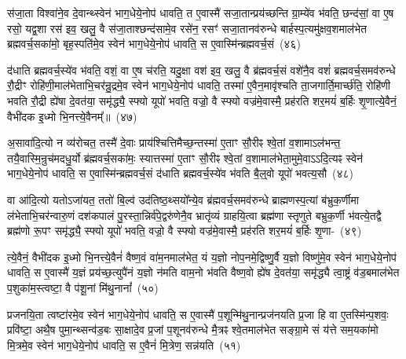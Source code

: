 स॑जा॒ता विश्वा॑ने॒व दे॒वान्थ्स्वेन॑ भाग॒धेये॒नोप॑ धावति॒ त ए॒वास्मै॑ सजा॒तान्प्रय॑च्छन्ति ग्रा॒म्ये॑व भ॑वति॒ छन्द॑सां॒ वा ए॒ष रसो॒ यद्व॒शा रस॑ इव॒ खलु॒ वै स॑जा॒ताश्छन्द॑सामे॒व रसे॑न॒ रसꣳ॑ सजा॒तानव॑\-रुन्धे बार्\mbox{}हस्प॒त्यमु॑क्षव॒शमाल॑भेत ब्रह्मवर्च॒सका॑मो॒ बृह॒स्पति॑मे॒व स्वेन॑ भाग॒धेये॒नोप॑ धावति॒ स ए॒वास्मि॑न्ब्रह्मवर्च॒सं~(४६)

द॑धाति ब्रह्मवर्च॒स्ये॑व भ॑वति॒ वशं॒ वा ए॒ष च॑रति॒ यदु॒क्षा वश॑ इव॒ खलु॒ वै ब्र॑ह्मवर्च॒सं वशे॑नै॒व वशं॑ ब्रह्मवर्च॒समव॑\-रुन्धे रौ॒द्रीꣳ रोहि॑णी॒माल॑भेताभि॒चर॑न्रु॒द्रमे॒व स्वेन॑ भाग॒धेये॒नोप॑ धावति॒ तस्मा॑ ए॒वैन॒मावृ॑श्चति ता॒जगार्ति॒मार्च्छ॑ति॒ रोहि॑णी भवति रौ॒द्री ह्ये॑षा दे॒वत॑या॒ समृ॑द्ध्यै॒ स्फ्यो यूपो॑ भवति॒ वज्रो॒ वै स्फ्यो वज्र॑मे॒वास्मै॒ प्रह॑रति शर॒मयं॑ ब॒र्\mbox{}हिः शृ॒णात्ये॒वैनं॒ वैभी॑दक इ॒ध्मो भि॒नत्त्ये॒वैनम्᳚॥~(४७)

{\anuvakamend[{अ॒भि खलु॒ वृष्टि॒श्छन्द॑सामे॒व रसे॑न प्र॒जामव॑ वैश्वदे॒वा वै ब्र॑ह्मवर्च॒सं यूप॒ एका॒न्नविꣳ॑श॒तिश्च॑।~(७)।}]}

अ॒सावा॑दि॒त्यो न व्य॑रोचत॒ तस्मै॑ दे॒वाः प्राय॑श्चित्ति\-मैच्छ॒न्तस्मा॑ ए॒ताꣳ सौ॒रीꣴ श्वे॒तां व॒शामा\-ऽल॑भन्त॒ तयै॒वास्मि॒न्रुच॑मदधु॒र्यो ब्र॑ह्मवर्च॒सका॑मः॒ स्यात्तस्मा॑ ए॒ताꣳ सौ॒रीꣴ श्वे॒तां व॒शामाल॑भेता॒मुमे॒\-वा\-ऽऽ\-दि॒त्यꣴ स्वेन॑ भाग॒धेये॒नोप॑ धावति॒ स ए॒वास्मि॑न्ब्रह्मवर्च॒सं द॑धाति ब्रह्मवर्च॒स्ये॑व भ॑वति बै॒ल्॒\mbox{}वो यूपो॑ भवत्य॒सौ~(४८)

वा आ॑दि॒त्यो यतो\-ऽजा॑यत॒ ततो॑ बि॒ल्व॑ उद॑तिष्ठ॒थ्सयो᳚न्ये॒व ब्र॑ह्मवर्च॒समव॑\-रुन्धे ब्राह्मणस्प॒त्यां ब॑भ्रुक॒र्णीमा ल॑भेताभि॒\-चर॑न्वारु॒णं दश॑\-कपालं पु॒रस्ता॒न्निर्व॑पे॒द्वरु॑णेनै॒व भ्रातृ॑व्यं ग्राहयि॒त्वा ब्रह्म॑णा स्तृणुते बभ्रुक॒र्णी भ॑वत्ये॒तद्वै ब्रह्म॑णो रू॒पꣳ समृ॑द्ध्यै॒ स्फ्यो यूपो॑ भवति॒ वज्रो॒ वै स्फ्यो वज्र॑मे॒वास्मै॒ प्रह॑रति शर॒मयं॑ ब॒र्\mbox{}हिः शृ॒णा-~(४९)

त्ये॒वैनं॒ वैभी॑दक इ॒ध्मो भि॒नत्त्ये॒वैनं॑ वैष्ण॒वं वा॑म॒नमा\-ल॑भेत॒ यं य॒ज्ञो नोप॒नमे॒द्विष्णु॒र्वै य॒ज्ञो विष्णु॑मे॒व स्वेन॑ भाग॒धेये॒नोप॑ धावति॒ स ए॒वास्मै॑ य॒ज्ञं प्रय॑च्छ॒त्युपै॑नं य॒ज्ञो न॑मति वाम॒नो भ॑वति वैष्ण॒वो ह्ये॑ष दे॒वत॑या॒ समृ॑द्ध्यै त्वा॒ष्ट्रं व॑ड॒बमाल॑भेत प॒शुका॑म॒स्त्वष्टा॒ वै प॑शू॒नां मि॑थु॒नानां᳚~(५०)

प्रजनयि॒ता त्वष्टा॑रमे॒व स्वेन॑ भाग॒धेये॒नोप॑ धावति॒ स ए॒वास्मै॑ प॒शून्मि॑थु॒नान्प्रज॑नयति प्र॒जा हि वा ए॒तस्मि॑न्प॒शवः॒ प्रवि॑ष्टा॒ अथै॒ष पुमा॒न्थ्सन्व॑ड॒बः सा॒क्षादे॒व प्र॒जां प॒शूनव॑\-रुन्धे मै॒त्रꣴ श्वे॒तमाल॑भेत सङ्ग्रा॒मे सं य॑त्ते सम॒यका॑मो मि॒त्रमे॒व स्वेन॑ भाग॒धेये॒नोप॑ धावति॒ स ए॒वैनं॑ मि॒त्रेण॒ सन्न॑यति~(५१)

